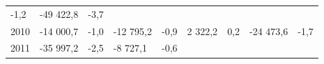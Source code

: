 \begin{longtable}[]{@{}lllllllll@{}}
\begin{minipage}[t]{0.06\columnwidth}
-1,2\strut
\end{minipage} & \begin{minipage}[t]{0.09\columnwidth}\raggedright
-49 422,8\strut
\end{minipage} & \begin{minipage}[t]{0.06\columnwidth}\raggedright
-3,7\strut
\end{minipage}\tabularnewline
\begin{minipage}[t]{0.05\columnwidth}\raggedright
2010\strut
\end{minipage} & \begin{minipage}[t]{0.10\columnwidth}\raggedright
-14 000,7\strut
\end{minipage} & \begin{minipage}[t]{0.06\columnwidth}\raggedright
-1,0\strut
\end{minipage} & \begin{minipage}[t]{0.16\columnwidth}\raggedright
-12 795,2\strut
\end{minipage} & \begin{minipage}[t]{0.06\columnwidth}\raggedright
-0,9\strut
\end{minipage} & \begin{minipage}[t]{0.12\columnwidth}\raggedright
2 322,2\strut
\end{minipage} & \begin{minipage}[t]{0.06\columnwidth}\raggedright
0,2\strut
\end{minipage} & \begin{minipage}[t]{0.09\columnwidth}\raggedright
-24 473,6\strut
\end{minipage} & \begin{minipage}[t]{0.06\columnwidth}\raggedright
-1,7\strut
\end{minipage}\tabularnewline
\begin{minipage}[t]{0.05\columnwidth}\raggedright
2011\strut
\end{minipage} & \begin{minipage}[t]{0.10\columnwidth}\raggedright
-35 997,2\strut
\end{minipage} & \begin{minipage}[t]{0.06\columnwidth}\raggedright
-2,5\strut
\end{minipage} & \begin{minipage}[t]{0.16\columnwidth}\raggedright
-8 727,1\strut
\end{minipage} & \begin{minipage}[t]{0.06\columnwidth}\raggedright
-0,6\strut
\end{minipage} & \begin{minipage}[t]{0.12\columnwidth}\raggedright

\end{minipage}
\end{longtable}
